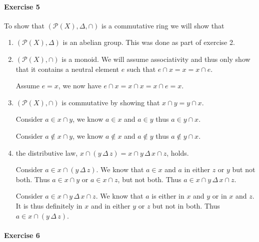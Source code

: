\documentclass{article}
\newcommand{\Deltaop}{\, \Delta\, }
\begin{document}
\pagebreak
\paragraph{Exercise 5}

To show that $(\mathcal{P}(X), \Delta, \cap)$ is a commutative ring we will show that
\begin{enumerate}
    \item $(\mathcal{P}(X), \Delta)$ is an abelian group. This was done as part of exercise 2.
    
    \item $(\mathcal{P}(X), \cap)$ is a monoid. We will assume associativity and thus only show that it contains a neutral element $e$ such that $e \cap x = x = x \cap e$.
    
    Assume $e = x$, we now have $e \cap x = x \cap x = x \cap e = x$.
    
    \item $(\mathcal{P}(X), \cap)$ is commutative by showing that $x \cap y = y \cap x$.
    
    Consider $a \in x \cap y$, we know $a \in x$ and $a \in y$ thus $a \in y \cap x$.
    
    Consider $a \not\in x \cap y$, we know $a \not\in x$ and $a \not\in y$ thus $a \not\in y \cap x$.
    
    \item the distributive law, $x \cap (y \Deltaop z) = x \cap y \Deltaop x \cap z$, holds.
    
    Consider $a \in x \cap (y \Deltaop z)$. We know that $a \in x$ and $a$ in either $z$ or $y$ but not both. Thus $a \in x \cap y$ or $a \in x \cap z$, but not both. Thus $a \in x \cap y \Deltaop x \cap z$.

    Consider $a \in x \cap y \Deltaop x \cap z$. We know that $a$ is either in $x$ and $y$ or in $x$ and $z$. It is thus definitely in $x$ and in either $y$ or $z$ but not in both. Thus $a \in x \cap (y \Deltaop z)$.
\end{enumerate}

\pagebreak
\paragraph{Exercise 6}
\end{document}
